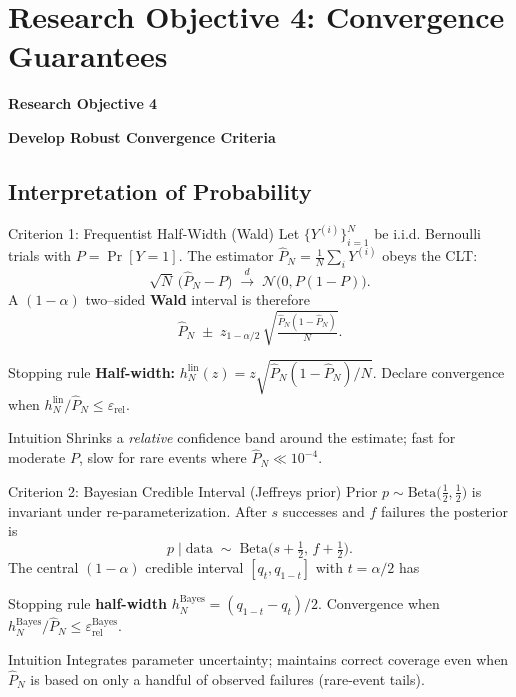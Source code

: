 
\section{Research Objective 4: Convergence Guarantees}
\begin{frame}
    \Large{\centerline{\textbf{Research Objective 4}}}
    \vspace{6pt}
    \large{\centerline{\textbf{Develop Robust Convergence Criteria}}}
\end{frame}
\subsection{Interpretation of Probability}
\begin{frame}{Criterion 1: Frequentist Half-Width (Wald)}
  \footnotesize
  Let $\{Y^{(i)}\}_{i=1}^N$ be i.i.d. Bernoulli trials with $P=\Pr[Y=1]$.  The estimator $\widehat P_N=\tfrac1N\sum_i Y^{(i)}$ obeys the CLT:
  \[\sqrt{N}\,\bigl(\widehat P_N-P\bigr) \;\xrightarrow{d}\; \mathcal N\bigl(0, P(1-P)\bigr).\]
  A $(1-\alpha)$ two–sided \textbf{Wald} interval is therefore
  \[ \widehat P_N \;\pm\; z_{1-\alpha/2}\, \sqrt{\tfrac{\widehat P_N(1-\widehat P_N)}{N}}. \]
  \begin{alertblock}{Stopping rule}
   \textbf{Half-width:} $h_N^{\text{lin}}(z)=z\sqrt{\widehat P_N(1-\widehat P_N)/N}.$ Declare convergence when $h_N^{\text{lin}}/\widehat P_N\le \varepsilon_{\text{rel}}$.
  \end{alertblock}
  \begin{block}{Intuition}
    Shrinks a \emph{relative} confidence band around the estimate; fast for moderate $P$, slow for rare events where $\widehat P_N\ll10^{-4}$.
  \end{block}
\end{frame}

\begin{frame}{Criterion 2: Bayesian Credible Interval (Jeffreys prior)}
  \footnotesize
  Prior $p\sim\text{Beta}\bigl(\tfrac12,\tfrac12\bigr)$ is invariant under re-parameterization.  After $s$ successes and $f$ failures the posterior is
  \[ p\mid\text{data}\;\sim\; \text{Beta}\bigl(s+\tfrac12,\,f+\tfrac12\bigr). \]
  The central $(1-\alpha)$ credible interval $[q_t,q_{1-t}]$ with $t=\alpha/2$ has
  \begin{alertblock}{Stopping rule}
  \textbf{half-width} $h_N^{\text{Bayes}}=(q_{1-t}-q_t)/2$. Convergence when $h_N^{\text{Bayes}}/\widehat P_N\le \varepsilon_{\text{rel}}^{\text{Bayes}}$.
  \end{alertblock}
  \begin{block}{Intuition}
  Integrates parameter uncertainty; maintains correct coverage even when $\widehat P_N$ is based on only a handful of observed failures (rare-event tails).
  \end{block}
\end{frame}

